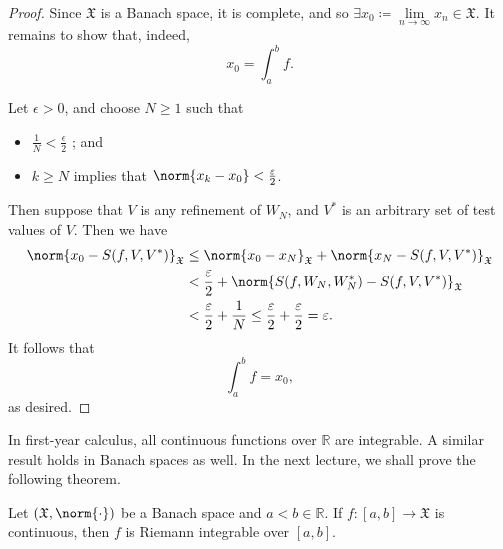 \documentclass[notoc,notitlepage]{tufte-book}
\begin{document}
\begin{proof}
  Since $\mathfrak{X}$ is a Banach space, it is complete, and so $\exists x_0
  \coloneqq \lim\limits_{n \to \infty} x_n \in \mathfrak{X}$. It remains to show
  that, indeed,
  \begin{equation*}
    x_0 = \int_{a}^{b} f.
  \end{equation*}

  Let $\epsilon > 0$, and choose $N \geq 1$ such that
  \begin{itemize}
    \item $\frac{1}{N} < \frac{\epsilon}{2}$ ; and
    \item $k \geq N$ implies that $\norm{x_k - x_0} < \frac{\epsilon}{2}$.
  \end{itemize}
  Then suppose that $V$ is any refinement of $W_N$, and $V^*$ is an arbitrary
  set of test values of $V$. Then we have
  \begin{align*}
    \norm{x_0 - S(f,V,V^*)}_{\mathfrak{X}}
    &\leq \norm{x_0 - x_N}_{\mathfrak{X}} + \norm{x_N -
      S(f,V,V^*)}_{\mathfrak{X}} \\
    &< \frac{\epsilon}{2} + \norm{S(f,W_N,W_N^*) - S(f,V,V^*)}_{\mathfrak{X}} \\
    &<\frac{\epsilon}{2} + \frac{1}{N} \leq \frac{\epsilon}{2} +
    \frac{\epsilon}{2} = \epsilon.
  \end{align*}
  It follows that
  \begin{equation*}
    \int_{a}^{b} f = x_0,
  \end{equation*}
  as desired.
\end{proof}

In first-year calculus, all continuous functions over $\mathbb{R}$ are
integrable. A similar result holds in Banach spaces as well.
In the next lecture, we shall prove the following theorem.

\begin{thmnonum}\label{thmnonum:continuous_functions_are_riemann_integrable}
  Let $(\mathfrak{X}, \norm{\cdot})$ be a Banach space and $a < b \in
  \mathbb{R}$. If $f : [a, b] \to \mathfrak{X}$ is continuous, then $f$ is
  Riemann integrable over $[a, b]$.
\end{thmnonum}



\appendix

\backmatter

\fancyhead[LE]{\thepage \enspace \textsl{\leftmark}}



\printindex
\end{document}
